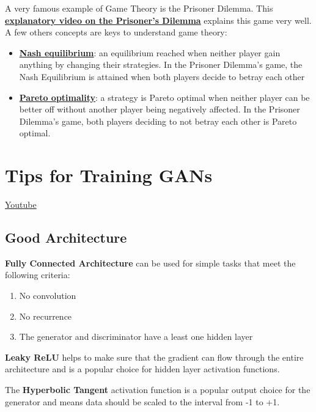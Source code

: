 A very famous example of Game Theory is the Prisoner Dilemma. This \href{https://www.youtube.com/watch?v=t9Lo2fgxWHw}{\textbf{explanatory video on the Prisoner's Dilemma}} explains this game very well. A few others concepts are keys to understand game theory:

\begin{itemize}
    \item \href{https://en.wikipedia.org/wiki/Nash_equilibrium}{\textbf{Nash equilibrium}}: an equilibrium reached when neither player gain anything by changing their strategies. In the Prisoner Dilemma's game, the Nash Equilibrium is attained when both players decide to betray each other
    \item \href{https://en.wikipedia.org/wiki/Pareto_efficiency}{\textbf{Pareto optimality}}: a strategy is Pareto optimal when neither player can be better off without another player being negatively affected. In the Prisoner Dilemma's game, both players deciding to not betray each other is Pareto optimal.
\end{itemize}

\section{Tips for Training GANs}
\href{https://www.youtube.com/watch?v=JXfgLuCLFM8}{Youtube}

\subsection{Good Architecture}

\textbf{Fully Connected Architecture} can be used for simple tasks that meet the following criteria:

\begin{enumerate}
    \item No convolution
    \item No recurrence
    \item The generator and discriminator have a least one hidden layer
\end{enumerate}
\textbf{Leaky ReLU} helps to make sure that the gradient can flow through the entire architecture and is a popular choice for hidden layer activation functions. \newline

The \textbf{Hyperbolic Tangent} activation function is a popular output choice for the generator and means data should be scaled to the interval from -1 to +1. \newline

